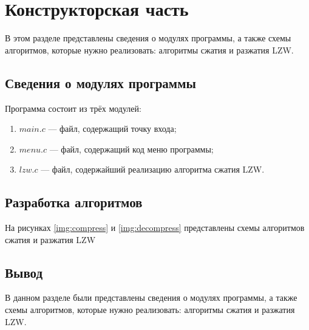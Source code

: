 \chapter{Конструкторская часть}
В этом разделе представлены сведения о модулях программы, а также схемы алгоритмов, которые нужно реализовать: алгоритмы сжатия и разжатия LZW.

\section{Сведения о модулях программы}
Программа состоит из трёх модулей:
\begin{enumerate}[label=\arabic*)]
	\item $main.c$ --- файл, содержащий точку входа;
    \item $menu.c$ --- файл, содержащий код меню программы;
    \item $lzw.c$ --- файл, содержайший реализацию алгоритма сжатия LZW.
\end{enumerate}

\section{Разработка алгоритмов}
На рисунках \ref{img:compress} и \ref{img:decompress} представлены схемы алгоритмов сжатия и разжатия LZW
\clearpage



\section*{Вывод}

В данном разделе были представлены сведения о модулях программы, а также схемы алгоритмов, которые нужно реализовать: алгоритмы сжатия и разжатия LZW.
